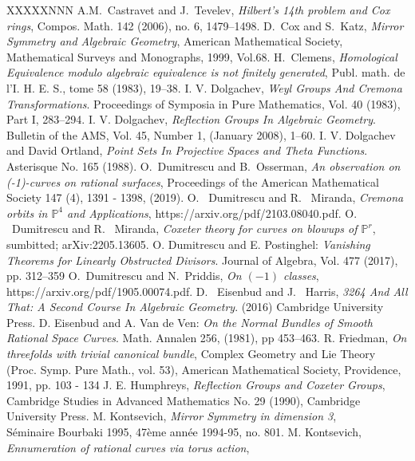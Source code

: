 \documentclass[12pt]{article}
\numberwithin{equation}{section}
\numberwithin{subeq}{equation}
\begin{document}
\begin{thebibliography}{XXXXXNNN}
 A.M.~Castravet and J.~Tevelev, {\it Hilbert's 14th problem and Cox rings}, Compos. Math. 142 (2006), no. 6, 1479--1498.
 D.~Cox and S.~Katz, {\it Mirror Symmetry and Algebraic Geometry}, American Mathematical Society, Mathematical Surveys and Monographs, 1999, Vol.68.
 H.~Clemens, {\it Homological Equivalence modulo algebraic equivalence is not finitely generated}, Publ. math. de l'I. H. E. S., tome 58 (1983), 19--38.
 I. V. Dolgachev, \emph{Weyl Groups And Cremona Transformations}. Proceedings of Symposia in Pure Mathematics, Vol. 40 (1983), Part I, 283--294.
 I. V. Dolgachev, \emph{Reflection Groups In Algebraic Geometry}.  Bulletin of the AMS, Vol. 45, Number 1, (January 2008), 1--60.
I. V. Dolgachev and David Ortland, \emph{Point Sets In Projective Spaces and Theta Functions}.  Asterisque No. 165 (1988).
 O.~Dumitrescu and B.~Osserman, {\it  An observation on (-1)-curves on rational surfaces}, Proceedings of the American Mathematical Society 147 (4), 1391 - 1398, (2019).
 O. ~Dumitrescu and R. ~Miranda, {\it Cremona orbits in $\mathbb{P}^4$ and Applications}, https://arxiv.org/pdf/2103.08040.pdf.
 O. ~Dumitrescu and R. ~Miranda, {\it Coxeter theory for curves on blowups of $\mathbb{P}^r$}, 
sumbitted; arXiv:2205.13605.
 O. Dumitrescu and E. Postinghel: \emph{Vanishing Theorems for Linearly Obstructed Divisors}.  Journal of Algebra, Vol. 477 (2017), pp. 312--359
 O.~Dumitrescu and  N.~Priddis, {\it  On $(-1)$ classes}, https://arxiv.org/pdf/1905.00074.pdf.
 D. ~Eisenbud and J.~ Harris, \emph{3264 And All That: A Second Course In Algebraic Geometry}. (2016) Cambridge University Press.
 D. Eisenbud and A. Van de Ven: \emph{On the Normal Bundles of Smooth Rational Space Curves}. Math. Annalen 256, (1981), pp 453--463.
 R. Friedman, {\it On threefolds with trivial canonical bundle}, Complex Geometry
and Lie Theory (Proc. Symp. Pure Math., vol. 53), American Mathematical
Society, Providence, 1991, pp. 103 - 134
 J. E. Humphreys, {\it  Reflection Groups and Coxeter Groups},  Cambridge Studies in Advanced Mathematics No. 29 (1990), Cambridge University Press.
M. Kontsevich, {\it Mirror Symmetry in dimension 3},  \\
S\'eminaire Bourbaki 1995, 47\`eme ann\'ee 1994-95, no. 801.
 M. Kontsevich, {\it Ennumeration of rational curves via torus action},\\

\end{thebibliography}
\end{document}
